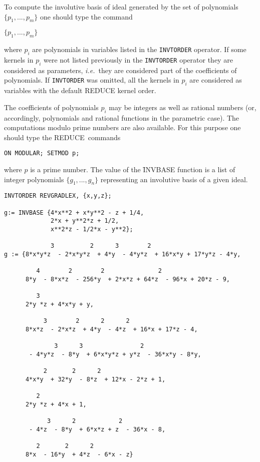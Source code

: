 \documentclass[11pt,letterpaper]{book}
\makeatletter
\newcommand{\REDUCE}{REDUCE}
\newcommand{\underscore}{\_}
\newcommand{\ttindex}[1]{{\renewcommand{\_}{\protect\underscore}%
                          \index{#1@{\tt #1}}}}
\makeatother
\begin{document}
To compute the involutive basis of ideal generated by the set of
polynomials $\{p_1,...,p_m\}$ one should type the command
\ttindex{INVBASE}

 $\{p_1,...,p_m\} $

where $p_i$ are polynomials in variables listed in the
{\tt INVTORDER} operator. If some kernels in $p_i$ were not listed
previously in the {\tt INVTORDER} operator they are considered as
parameters, {\em i.e.\ }they are considered part of the coefficients of
polynomials.  If {\tt INVTORDER} was omitted, all the kernels
in $p_i$ are considered as variables with the default \REDUCE{}
kernel order.

The coefficients of polynomials $p_i$ may be integers as well as
rational numbers (or, accordingly, polynomials and rational functions
in the parametric case). The computations modulo prime numbers are
also available. For this purpose one should type the \REDUCE\ commands
{\small\begin{verbatim}
ON MODULAR; SETMOD p;
\end{verbatim}}
where $p$ is a prime number.
The value of the \f{INVBASE} function is a list of integer polynomials
$\{g_1,...,g_n\}$ representing an involutive basis of a given ideal.

{\small\begin{verbatim}
INVTORDER REVGRADLEX, {x,y,z};

g:= INVBASE {4*x**2 + x*y**2 - z + 1/4,
             2*x + y**2*z + 1/2,
             x**2*z - 1/2*x - y**2};

             3          2      3        2
g := {8*x*y*z  - 2*x*y*z  + 4*y  - 4*y*z  + 16*x*y + 17*y*z - 4*y,

         4        2        2               2
      8*y  - 8*x*z  - 256*y  + 2*x*z + 64*z  - 96*x + 20*z - 9,

         3
      2*y *z + 4*x*y + y,

           3        2      2      2
      8*x*z  - 2*x*z  + 4*y  - 4*z  + 16*x + 17*z - 4,

              3      3                2
       - 4*y*z  - 8*y  + 6*x*y*z + y*z  - 36*x*y - 8*y,

           2       2      2
      4*x*y  + 32*y  - 8*z  + 12*x - 2*z + 1,

         2
      2*y *z + 4*x + 1,

            3      2            2
       - 4*z  - 8*y  + 6*x*z + z  - 36*x - 8,

         2       2      2
      8*x  - 16*y  + 4*z  - 6*x - z}
\end{verbatim}}
\end{document}
